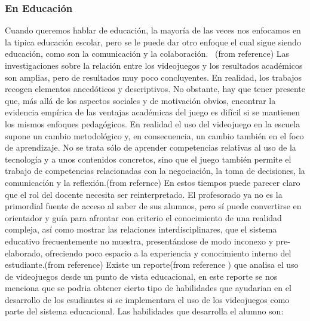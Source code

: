 \documentclass{bmcart}
\begin{document}
\subsubsection*{En Educación}
Cuando queremos hablar de educación, la mayoría de las veces nos enfocamos en la tipica educación escolar, pero se le puede dar otro enfoque el cual sigue siendo  educación, como son la comunicación y la colaboración.
\ (from reference\cite {sanchez2008videojuegos})
\newline
\newline
Las investigaciones sobre la relación entre los videojuegos y los resultados académicos son amplias, pero de resultados muy poco concluyentes. En realidad, los trabajos recogen elementos anecdóticos y descriptivos. No obstante, hay que tener presente que, más allá de los aspectos sociales y de motivación obvios, encontrar la evidencia empírica de las ventajas académicas del juego es difícil si se mantienen los mismos enfoques pedagógicos. En realidad el uso del videojuego en la escuela supone un cambio metodológico y, en consecuencia, un cambio también en el foco de aprendizaje. No se trata sólo de aprender competencias relativas al uso de la tecnología y a unos contenidos concretos, sino que el juego también permite el trabajo de competencias relacionadas con la negociación, la toma de decisiones, la comunicación y la reflexión.(from refernce\cite{salvat2008videojuegos})
\newline
\newline
En estos tiempos puede parecer claro que el rol del docente necesita ser reinterpretado. El profesorado ya no es la primordial fuente de acceso al saber de sus alumnos, pero sí puede convertirse en orientador y guía para afrontar con criterio el conocimiento de una realidad compleja, así como mostrar las relaciones interdisciplinares, que el sistema educativo frecuentemente no muestra, presentándose de modo inconexo y pre-elaborado, ofreciendo poco espacio a la experiencia y conocimiento interno del estudiante.(from reference\cite{ruiz2012aprendiendo})
\newline
\newline
Existe un reporte(from reference \cite{mcfa}) que analisa el uso de videojuegos desde un punto de vista educacional, en este reporte se nos menciona que se podria obtener cierto tipo de habilidades que ayudarian en el desarrollo de los esudiantes si se implementara el uso de los videojuegos como parte del sistema educacional. Las habilidades que desarrolla el alumno son:
\end{document}
